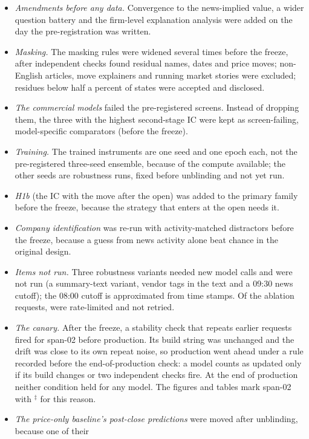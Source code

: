 \begin{itemize}[leftmargin=*, itemsep=1pt]
\item \emph{Amendments before any data.} Convergence to the news-implied value, a wider question battery and the
  firm-level explanation analysis were added on the day the pre-registration was written.
\item \emph{Masking.} The masking rules were widened several times before the freeze, after independent checks
  found residual names, dates and price moves; non-English articles, move explainers and running market stories
  were excluded; residues below half a percent of states were accepted and disclosed.
\item \emph{The commercial models} failed the pre-registered screens. Instead of dropping them, the three with
  the highest second-stage IC were kept as screen-failing, model-specific comparators (before the freeze).
\item \emph{Training.} The trained instruments are one seed and one epoch each, not the pre-registered three-seed
  ensemble, because of the compute available; the other seeds are robustness runs, fixed before unblinding and
  not yet run.
\item \emph{H1b} (the IC with the move after the open) was added to the primary family before the freeze, because
  the strategy that enters at the open needs it.
\item \emph{Company identification} was re-run with activity-matched distractors before the freeze, because a
  guess from news activity alone beat chance in the original design.
\item \emph{Items not run.} Three robustness variants needed new model calls and were not run (a summary-text
  variant, vendor tags in the text and a 09:30 news cutoff); the 08:00 cutoff is approximated from time stamps.
  Of the ablation requests,  were rate-limited and not retried.
\item \emph{The canary.} After the freeze, a stability check that repeats earlier requests fired for span-02
  before production. Its build string was unchanged and the drift was close to its own repeat noise, so production
  went ahead under a rule recorded before the end-of-production check: a model counts as updated only if its build
  changes or two independent checks fire. At the end of production neither condition held for any model. The
  figures and tables mark span-02 with $^{\ddagger}$ for this reason.
\item \emph{The price-only baseline's post-close predictions} were moved after unblinding, because one of their

\end{itemize}
